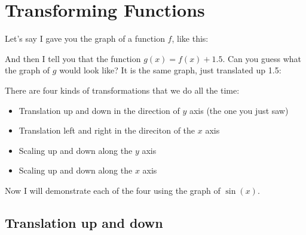 \chapter{Transforming Functions}

Let's say I gave you the graph of a function $f$, like this:


And then I tell you that the function $g(x) = f(x) + 1.5$.  Can you guess what the graph of $g$ would look like? It is the same graph, just translated up 1.5:


There are four kinds of transformations that we do all the time:
\begin{itemize}
\item Translation up and down in the direction of $y$ axis (the one you just saw)
\item Translation left and right in the direciton of the $x$ axis
\item Scaling up and down along the $y$ axis
\item Scaling up and down along the $x$ axis
\end{itemize}

Now I will demonstrate each of the four using the graph of $\sin(x)$.

\section{Translation up and down}

